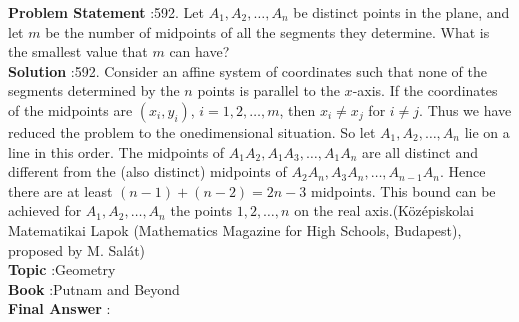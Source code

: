 \documentclass[10pt]{article}
\begin{document}
\textbf{Problem Statement} :592. Let $A_{1}, A_{2}, \ldots, A_{n}$ be distinct points in the plane, and let $m$ be the number of midpoints of all the segments they determine. What is the smallest value that $m$ can have?\\
\textbf{Solution} :592. Consider an affine system of coordinates such that none of the segments determined by the $n$ points is parallel to the $x$-axis. If the coordinates of the midpoints are $\left(x_{i}, y_{i}\right)$, $i=1,2, \ldots, m$, then $x_{i} \neq x_{j}$ for $i \neq j$. Thus we have reduced the problem to the onedimensional situation. So let $A_{1}, A_{2}, \ldots, A_{n}$ lie on a line in this order. The midpoints of $A_{1} A_{2}, A_{1} A_{3}, \ldots, A_{1} A_{n}$ are all distinct and different from the (also distinct) midpoints of $A_{2} A_{n}, A_{3} A_{n}, \ldots, A_{n-1} A_{n}$. Hence there are at least $(n-1)+(n-2)=2 n-3$ midpoints. This bound can be achieved for $A_{1}, A_{2}, \ldots, A_{n}$ the points $1,2, \ldots, n$ on the real axis.(Középiskolai Matematikai Lapok (Mathematics Magazine for High Schools, Budapest), proposed by M. Salát)\\
\textbf{Topic} :Geometry\\
\textbf{Book} :Putnam and Beyond\\
\textbf{Final Answer} :\\
\end{document}
